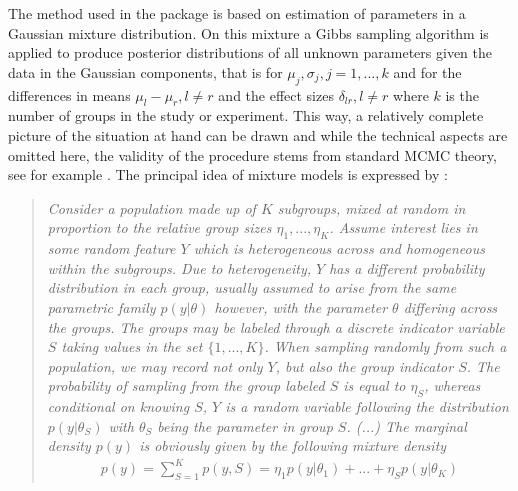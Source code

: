 The method used in the  package is based on estimation of parameters in a Gaussian mixture distribution. On this mixture a Gibbs sampling algorithm is applied to produce posterior distributions of all unknown parameters given the data in the Gaussian components, that is for $\mu_j,\sigma_j, j=1,...,k$ and for the differences in means $\mu_l-\mu_r,l\neq r$ and the effect sizes $\delta_{lr},l\neq r$ where $k$ is the number of groups in the study or experiment. This way, a relatively complete picture of the situation at hand can be drawn and while the technical aspects are omitted here, the validity of the procedure stems from standard MCMC theory, see for example \cite{Robert2004}.
The principal idea of mixture models is expressed by \cite{Fruhwirth-Schnatter2006}:
\begin{quote}
	\textit{Consider a population made up of $K$ subgroups, mixed at random in proportion to the relative group sizes $\eta_1,...,\eta_K$. Assume interest lies in some random feature $Y$ which is heterogeneous across and homogeneous within the subgroups. Due to heterogeneity, $Y$ has a different probability distribution in each group, usually assumed to arise from the same parametric family $p(y|\theta)$ however, with the parameter $\theta$ differing across the groups. The groups may be labeled through a discrete indicator variable $S$ taking values in the set $\{1,...,K\}$.\newline
	When sampling randomly from such a population, we may record not only $Y$, but also the group indicator $S$. The probability of sampling from the group labeled $S$ is equal to $\eta_S$, whereas conditional on knowing $S$, $Y$ is a random variable following the distribution $p(y|\theta_S)$ with $\theta_S$ being the parameter in group $S$. (...) The marginal density $p(y)$ is obviously given by the following mixture density
	\begin{align*}
		p(y)=\sum_{S=1}^K p(y,S)=\eta_1 p(y|\theta_1)+...+\eta_S p(y|\theta_K)	
	\end{align*}}
	\end{quote}
